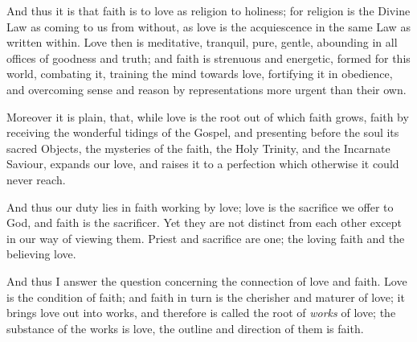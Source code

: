 And thus it is that faith is to love as religion to holiness; for
religion is the Divine Law as coming to us from without, as love is
the acquiescence in the same Law as written within. Love then is
meditative, tranquil, pure, gentle, abounding in all offices of
goodness and truth; and faith is strenuous and energetic, formed for
this world, combating it, training the mind towards love, fortifying
it in obedience, and overcoming sense and reason by representations
more urgent than their own.

Moreover it is plain, that, while love is the root out of which
faith grows, faith by receiving the wonderful tidings of the Gospel,
and presenting before the soul its sacred Objects, the mysteries of
the faith, the Holy Trinity, and the Incarnate Saviour, expands our
love, and raises it to a perfection which otherwise it could never
reach.

And thus our duty lies in faith working by love; love is the
sacrifice we offer to God, and faith is the sacrificer. Yet they are
not distinct from each other except in our way of viewing them. Priest
and sacrifice are one; the loving faith and the believing love.

And thus I answer the question concerning the connection of love
and faith. Love is the condition of faith; and faith in turn is the
cherisher and maturer of love; it brings love out into works, and
therefore is called the root of \emph{works} of love; the substance of
the works is love, the outline and direction of them is faith.

